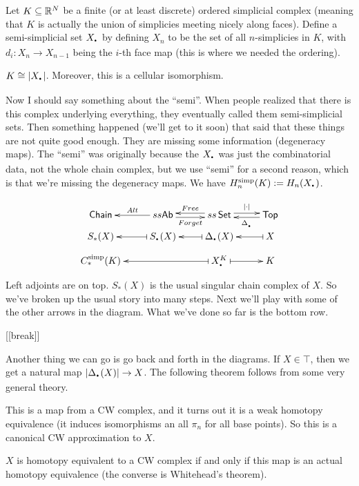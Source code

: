 Let $K\subseteq \mathbb{R}^N$ be a finite (or at least discrete) ordered simplicial complex (meaning that $K$ is actually the union of simplicies meeting nicely along faces). Define a semi-simplicial set $X_\udot$ by defining $X_n$ to be the set of all $n$-simplicies in $K$, with $d_i\colon X_n\to X_{n-1}$ being the $i$-th face map (this is where we needed the ordering).
\begin{lemma}
 $K\cong |X_\udot|$. Moreover, this is a cellular isomorphism.
\end{lemma}
Now I should say something about the ``semi''. When people realized that there is this complex underlying everything, they eventually called them semi-simplicial sets. Then something happened (we'll get to it soon) that said that these things are not quite good enough. They are missing some information (degeneracy maps). The ``semi'' was originally because the $X_\udot$ was just the combinatorial data, not the whole chain complex, but we use ``semi'' for a second reason, which is that we're missing the degeneracy maps. We have $H_n^{\text{simp}}(K):= H_n(X_\udot)$.

\[\xymatrix@R-1.5pc{
 \chain & ss\ab \ar[l]_-{Alt} \ar@<-.5ex>[r]_-{Forget} & ss\set \ar@<-.5ex>[l]_-{Free} \ar@<.5ex>[r]^-{|\cdot|} & \top \ar@<.5ex>[l]^-{\Delta_\udot}\\
  S_*(X) & S_\udot(X)\ar@{|->}[l] & \Delta_\udot(X) \ar@{|->}[l] & X\ar@{|->}[l]\\
  C_*^{\text{simp}}(K) & & X_\udot^K \ar@{|->}[ll]\ar@{|->}[r] & K
}\]
Left adjoints are on top. $S_*(X)$ is the usual singular chain complex of $X$. So we've broken up the usual story into many steps. Next we'll play with some of the other arrows in the diagram. What we've done so far is the bottom row.

[[break]]

Another thing we can go is go back and forth in the diagrams. If $X\in \top$, then we get a natural map $|\Delta_\udot(X)|\to X$. The following theorem follows from some very general theory.
\begin{theorem}
 This is a map from a CW complex, and it turns out it is a weak homotopy equivalence (it induces isomorphisms an all $\pi_n$ for all base points). So this is a canonical CW approximation to $X$. 
\end{theorem}
\begin{remark}
 $X$ is homotopy equivalent to a CW complex if and only if this map is an actual homotopy equivalence (the converse is Whitehead's theorem).
\end{remark}

